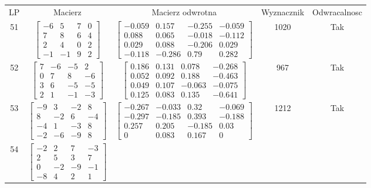 \documentclass[a4paper,12pt]{article}
\begin{document}
\bgroup {} \vspace{0.2in} \begin{tabular}{c c c c c}
LP & Macierz & Macierz odwrotna & Wyznacznik & Odwracalnosc\\
51
&
$\begin{bmatrix} -6 & 5 & 7 & 0 \\ 7 & 8 & 6 & 4 \\ 2 & 4 & 0 & 2 \\ -1 & -1 & 9 & 2 \end{bmatrix}$
&
$\begin{bmatrix} -0.059 & 0.157 & -0.255 & -0.059 \\ 0.088 & 0.065 & -0.018 & -0.112 \\ 0.029 & 0.088 & -0.206 & 0.029 \\ -0.118 & -0.286 & 0.79 & 0.282 \end{bmatrix}$
&
1020
&
Tak
\\
52
&
$\begin{bmatrix} 7 & -6 & -5 & 2 \\ 0 & 7 & 8 & -6 \\ 3 & 6 & -5 & -5 \\ 2 & 1 & -1 & -3 \end{bmatrix}$
&
$\begin{bmatrix} 0.186 & 0.131 & 0.078 & -0.268 \\ 0.052 & 0.092 & 0.188 & -0.463 \\ 0.049 & 0.107 & -0.063 & -0.075 \\ 0.125 & 0.083 & 0.135 & -0.641 \end{bmatrix}$
&
967
&
Tak
\\
53
&
$\begin{bmatrix} -9 & 3 & -2 & 8 \\ 8 & -2 & 6 & -4 \\ -4 & 1 & -3 & 8 \\ -2 & -6 & -9 & 8 \end{bmatrix}$
&
$\begin{bmatrix} -0.267 & -0.033 & 0.32 & -0.069 \\ -0.297 & -0.185 & 0.393 & -0.188 \\ 0.257 & 0.205 & -0.185 & 0.03 \\ 0 & 0.083 & 0.167 & 0 \end{bmatrix}$
&
1212
&
Tak
\\
54
&
$\begin{bmatrix} -2 & 2 & 7 & -3 \\ 2 & 5 & 3 & 7 \\ 0 & -2 & -9 & -1 \\ -8 & 4 & 2 & 1 \end{bmatrix}$

\end{tabular}
\end{document}
